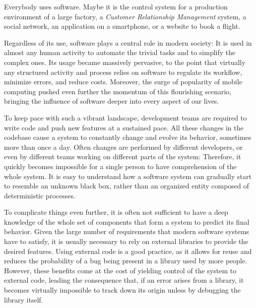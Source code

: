 

Everybody uses software.
Maybe it is the control system for a production environment of a large factory, a \emph{Customer Relationship Management} system, a social network, an application on a smartphone, or a website to book a flight.

Regardless of its use, software plays a central role in modern society: It is used in almost any human activity to automate the trivial tasks and to simplify the complex ones.
Its usage became massively pervasive, to the point that virtually any structured activity and process relies on software to regulate its workflow, minimize errors, and reduce costs.
Moreover, the surge of popularity of mobile computing pushed even further the momentum of this flourishing scenario, bringing the influence of software deeper into every aspect of our lives.

To keep pace with such a vibrant landscape, development teams are required to write code and push new features at a sustained pace.
All these changes in the codebase cause a system to constantly change and evolve its behavior, sometimes more than once a day.
Often changes are performed by different developers, or even by different teams working on different parts of the system: Therefore, it quickly becomes impossible for a single person to have comprehension of the whole system.
It is easy to understand how a software system can gradually start to resemble an unknown black box, rather than an organized entity composed of deterministic processes.

To complicate things even further, it is often not sufficient to have a deep knowledge of the whole set of components that form a system to predict its final behavior.
Given the large number of requirements that modern software systems have to satisfy, it is usually necessary to rely on external libraries to provide the desired features.
Using external code is a good practice, as it allows for reuse and reduces the probability of a bug being present in a library used by more people.
However, these benefits come at the cost of yielding control of the system to external code, leading the consequence that, if an error arises from a library, it becomes virtually impossible to track down its origin unless by debugging the library itself.

